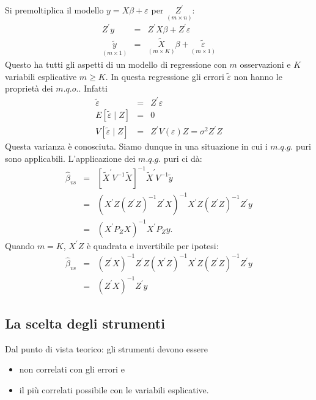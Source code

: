 \documentclass[a4paper]{report}
\theoremstyle{remark}
\begin{document}
Si premoltiplica il modello $y=X\beta +\varepsilon $ per $\underset{(m\times
n)}{Z^{\prime }}$: 
\begin{eqnarray*}
Z^{\prime }y &=&Z^{\prime }X\beta +Z^{\prime }\varepsilon \\
\underset{(m\times 1)}{\tilde{y}} &=&\underset{(m\times K)}{\tilde{X}}\beta +%
\underset{(m\times 1)}{\tilde{\varepsilon}}
\end{eqnarray*}%
Questo ha tutti gli aspetti di un modello di regressione con $m$
osservazioni e $K$ variabili esplicative $m\geq K$. In questa regressione
gli errori $\tilde{\varepsilon}$ non hanno le propriet\`{a} dei $m.q.o.$.
Infatti 
\begin{eqnarray*}
\tilde{\varepsilon} &=&Z^{\prime }\varepsilon \\
E\left[ \widetilde{\varepsilon }\mid Z\right] &=&0 \\
V\left[ \widetilde{\varepsilon }\mid Z\right] &=&Z^{\prime }V(\varepsilon
)Z=\sigma ^{2}Z^{\prime }Z
\end{eqnarray*}%
Questa varianza \`{e} conosciuta. Siamo dunque in una situazione in cui i $%
m.q.g.$ puri sono applicabili. L'applicazione dei $m.q.g.$ puri ci d\`{a}: 
\begin{eqnarray*}
\widehat{\beta }_{vs} &=&\left[ \widetilde{X}^{\prime }V^{-1}\widetilde{X}%
\right] ^{-1}\widetilde{X}^{\prime }V^{-1}\widetilde{y} \\
&=&\left( X^{\prime }Z(Z^{\prime }Z)^{-1}Z^{\prime }X\right) ^{-1}X^{\prime
}Z(Z^{\prime }Z)^{-1}Z^{\prime }y \\
&=&(X^{\prime }P_{Z}X)^{-1}X^{\prime }P_{Z}y.
\end{eqnarray*}%
Quando $m=K$, $X^{\prime }Z$ \`{e} quadrata e invertibile per ipotesi:%
\begin{eqnarray*}
\widehat{\beta }_{vs} &=&(Z^{\prime }X)^{-1}Z^{\prime }Z(X^{\prime
}Z)^{-1}X^{\prime }Z(Z^{\prime }Z)^{-1}Z^{\prime }y \\
&=&(Z^{\prime }X)^{-1}Z^{\prime }y
\end{eqnarray*}

\subsection{La scelta degli strumenti}

Dal punto di vista teorico: gli strumenti devono essere

\begin{itemize}
\item non correlati con gli errori e

\item il pi\`{u} correlati possibile con le variabili esplicative.\vspace{%
0.5cm}
\end{itemize}
\end{document}
